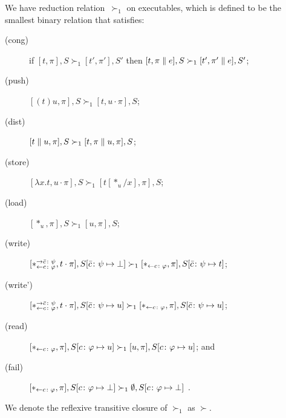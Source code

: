 \newcommand{\red}{\succ_1}
\renewcommand{\reduce}{\succ}
We have reduction relation~$\red$ on executables,
which is defined to be the smallest binary relation
that satisfies:
\begin{description}
 \item[(cong)] if
	    $[t,\pi],         S \red [ t',\pi'],        S'$
	    then
	    $[t,\pi \conc e], S \red [ t',\pi'\conc e], S'$\enspace;
 \item[(push)]
	    $[(t)u,\pi],S       \red [t,u\cdot\pi],S$;
 \item[(dist)]
	    $[t\conc u,\pi],S   \red [t,\pi\conc u,\pi],S$\enspace;
 \item[(store)]
	    $[\lambda x.t,u\cdot\pi],S
	     \red
	     [t[\ast_u/x],      \pi],S$\enspace;
 \item[(load)]
	    $[\ast_u,\pi],S\red[u,\pi],S$\enspace;
 \item[(write)]
	    $
	    [\comod c\phi{\co c}\psi, t\cdot\pi], S[\co
	    c\colon\psi\mapsto\bot]
	    \red
	    [\reader c\phi, \pi],
	    S[\co c\colon\psi\mapsto t]
	    $\enspace;
 \item[(write')]
	    $
	    [\comod c\phi{\co c}\psi, t\cdot\pi], S[\co
	    c\colon\psi\mapsto u]
	    \red
	    [\reader c\phi, \pi],
	    S[\co c\colon\psi\mapsto u]
	    $\enspace;
 \item[(read)]$
	    [\reader c \phi,\pi],
	    S[c\colon\phi\mapsto u]
	    \red
	    [u,\pi],
	    S[c\colon\phi\mapsto u]
	    $\enspace; and
 \item[(fail)]
	    $
	    [\reader c\phi,\pi],
	    S[c\colon\phi\mapsto \bot]
	    \red
	    \emptyset,S[c\colon\phi\mapsto \bot]
	    $
	    \enspace.
\end{description}
We denote the reflexive transitive closure of $\red$ as $\reduce$.



